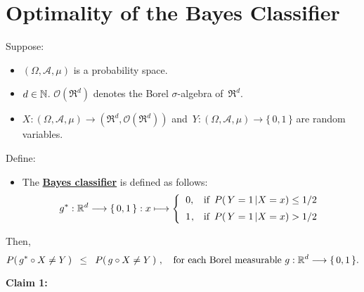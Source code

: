 

\section{Optimality of the Bayes Classifier}
\setcounter{theorem}{0}
\setcounter{equation}{0}


\renewcommand{\theenumi}{\roman{enumi}}
\renewcommand{\labelenumi}{\textnormal{(\theenumi)}$\;\;$}


\begin{theorem}
\mbox{}\vskip 0.1cm
\noindent
Suppose:
\begin{itemize}
\item
	$(\Omega,\mathcal{A},\mu)$ is a probability space.
\item
	$d \in \N$.
	$\mathcal{O}(\Re^{d})$ denotes the Borel $\sigma$-algebra of \,$\Re^{d}$.
\item
	$X : (\Omega,\mathcal{A},\mu) \longrightarrow (\Re^{d},\mathcal{O}(\Re^{d}))$ and\,
	$Y : (\Omega,\mathcal{A},\mu) \longrightarrow \{\,0,1\,\}$
	are random variables.
\end{itemize}
Define:
\begin{itemize}
\item
	The \underline{\textbf{Bayes classifier}} is defined as follows:
	\begin{equation*}
	g^{*} : \Re^{d} \longrightarrow \{\,0,1\,\} : x \longmapsto
		\left\{\begin{array}{cl}
			0, & \textnormal{if \,$P(\,Y=1 \,\vert X = x) \leq 1/2$}
			\\
			\overset{{\color{white}-}}{1}, & \textnormal{if \,$P(\,Y=1 \,\vert X = x) > 1/2$}
		\end{array}\right.
	\end{equation*}
\end{itemize}
Then,
\begin{equation*}
P\!\left(\, g^{*} \circ X \neq Y \,\right)
\;\;\leq\;\;
	P\!\left(\, g \circ X \neq Y \,\right)\,,
	\quad
	\textnormal{for each Borel measurable $g : \Re^{d} \longrightarrow \{\,0,1\,\}$.}
\end{equation*}
\end{theorem}
\proof
\vskip 0.2cm
\noindent
\textbf{Claim 1:}\quad

